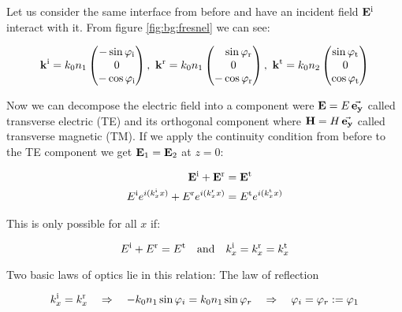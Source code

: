 Let us consider the same interface from before and have an incident field
$\vb E^{\mathrm{i}}$ interact with it. From figure \ref{fig:bg:fresnel} we can see:

\begin{equation} \label{eq:bg:k}
    \vb k^{\mathrm{i}} = k_0 n_1
    \begin{pmatrix}
        -\sin \varphi_{\mathrm{i}}\\ 0\\ -\cos \varphi_{\mathrm{i}}
    \end{pmatrix}
    , \
    \vb k^{\mathrm{r}} = k_0 n_1
    \begin{pmatrix}
        \phantom{-} \sin \varphi_{\mathrm{r}} \\ 0\\ -\cos \varphi_{\mathrm{r}}
    \end{pmatrix}
    , \
    \vb k^{\mathrm{t}} = k_0 n_2
    \begin{pmatrix}
        \sin \varphi_{\mathrm{t}}\\ 0\\ \cos \varphi_{\mathrm{t}}
    \end{pmatrix}
\end{equation}

Now we can decompose the electric field into a component were $\vb E = E \, \va{e_y}$ called transverse electric (TE) and its orthogonal component where $\vb H = H \, \va{e_y}$ called transverse magnetic (TM). If we apply the continuity condition from before to the TE component we get $\vb E_1 = \vb E_2$ at $z = 0$:

\begin{equation}
\begin{aligned}
    \vb E^{\mathrm{i}} + \vb E^{\mathrm{r}} &= \vb E^{\mathrm{t}} \\
    E^{\mathrm{i}} e^{i(k^{\mathrm{i}}_x x)} + E^{\mathrm{r}} e^{i(k^{\mathrm{r}}_x x)}
    &= E^{\mathrm{t}} e^{i(k^{\mathrm{t}}_x x)}
\end{aligned}
\end{equation}

This is only possible for all $x$ if:

\begin{equation} \label{eq:bg:x}
    E^\s{i} + E^\s{r} = E^\s{t} \qq{and}
    k^\s{i}_x = k^\s{r}_x = k^\s{t}_x
\end{equation}

Two basic laws of optics lie in this relation: The law of reflection 

\begin{equation}
    k^{\mathrm{i}}_x = k^{\mathrm{r}}_x
    \quad \Rightarrow \quad
    - k_0 n_1 \sin \varphi_i =  k_0 n_1 \sin \varphi_r
    \quad \Rightarrow \quad
    \varphi_i = \varphi_r := \varphi_1
\end{equation}

